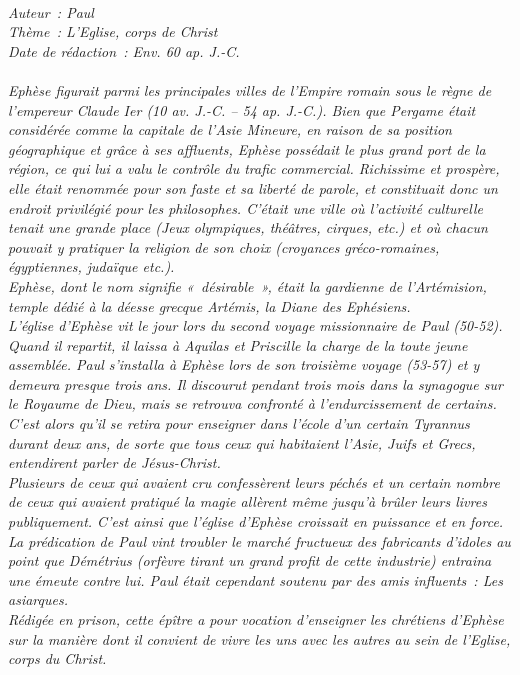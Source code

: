 \BFont
\noindent\hrulefill
{\footnotesize
\textit{
\bigskip
{\centering{}
\\Auteur~: Paul
\\Thème~: L'Eglise, corps de Christ
\\Date de rédaction~: Env. 60 ap. J.-C.\\}
}
\textit{
\\Ephèse figurait parmi les principales villes de l'Empire romain sous le règne de l'empereur Claude Ier (10 av. J.-C. – 54 ap. J.-C.). Bien que Pergame était considérée comme la capitale de l'Asie Mineure, en raison de sa position géographique et grâce à ses affluents, Ephèse possédait le plus grand port de la région, ce qui lui a valu le contrôle du trafic commercial. Richissime et prospère, elle était renommée pour son faste et sa liberté de parole, et constituait donc un endroit privilégié pour les philosophes. C'était une ville où l'activité culturelle tenait une grande place (Jeux olympiques, théâtres, cirques, etc.) et où chacun pouvait y pratiquer la religion de son choix (croyances gréco-romaines, égyptiennes, judaïque etc.).
\\Ephèse, dont le nom signifie «~désirable~», était la gardienne de l'Artémision, temple dédié à la déesse grecque Artémis, la Diane des Ephésiens.
\\L'église d'Ephèse vit le jour lors du second voyage missionnaire de Paul (50-52). Quand il repartit, il laissa à Aquilas et Priscille la charge de la toute jeune assemblée. Paul s'installa à Ephèse lors de son troisième voyage (53-57) et y demeura presque trois ans. Il discourut pendant trois mois dans la synagogue sur le Royaume de Dieu, mais se retrouva confronté à l'endurcissement de certains. C'est alors qu'il se retira pour enseigner dans l'école d'un certain Tyrannus durant deux ans, de sorte que tous ceux qui habitaient l'Asie, Juifs et Grecs, entendirent parler de Jésus-Christ.
\\Plusieurs de ceux qui avaient cru confessèrent leurs péchés et un certain nombre de ceux qui avaient pratiqué la magie allèrent même jusqu'à brûler leurs livres publiquement. C'est ainsi que l'église d'Ephèse croissait en puissance et en force. La prédication de Paul vint troubler le marché fructueux des fabricants d'idoles au point que Démétrius (orfèvre tirant un grand profit de cette industrie) entraina une émeute contre lui. Paul était cependant soutenu par des amis influents~: Les asiarques.
\\Rédigée en prison, cette épître a pour vocation d'enseigner les chrétiens d'Ephèse sur la manière dont il convient de vivre les uns avec les autres au sein de l'Eglise, corps du Christ.\bigskip
}
}
